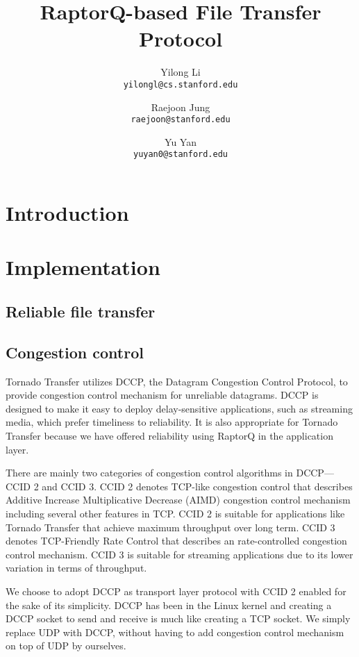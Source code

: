 \documentclass{sig-alternate-10pt}
\begin{document}
\title{RaptorQ-based File Transfer Protocol} 
\author{ 
Yilong Li\\
\texttt{yilongl@cs.stanford.edu} \and 
Raejoon Jung\\
\texttt{raejoon@stanford.edu} \and 
Yu Yan\\ 
\texttt{yuyan0@stanford.edu} 
}

\maketitle 

\section{Introduction}

\section{Implementation}

\subsection{Reliable file transfer} 

\subsection{Congestion control}
Tornado Transfer utilizes DCCP, the Datagram Congestion Control Protocol, to provide congestion control mechanism for unreliable datagrams. DCCP is designed to make it easy to deploy delay-sensitive applications, such as streaming media, which prefer timeliness to reliability. It is also appropriate for Tornado Transfer because we have offered reliability using RaptorQ in the application layer. 

There are mainly two categories of congestion control algorithms in DCCP--- CCID 2 and CCID 3. CCID 2 denotes TCP-like congestion control that describes Additive Increase Multiplicative Decrease (AIMD) congestion control mechanism including several other features in TCP. CCID 2 is suitable for applications like Tornado Transfer that achieve maximum throughput over long term. CCID 3 denotes TCP-Friendly Rate Control that describes an rate-controlled congestion control mechanism. CCID 3 is suitable for streaming applications due to its lower variation in terms of throughput.

We choose to adopt DCCP as transport layer protocol with CCID 2 enabled for the sake of its simplicity. DCCP has been in the Linux kernel and creating a DCCP socket to send and receive is much like creating a TCP socket. We simply replace UDP with DCCP, without having to add congestion control mechanism on top of UDP by ourselves.
\end{document}
